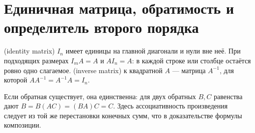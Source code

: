 \section{Единичная матрица, обратимость и определитель второго порядка}
\begin{definition}
 (identity matrix) \(I_n\) имеет единицы на главной диагонали и нули вне неё. При подходящих размерах \(I_mA=A\) и \(AI_n=A\): в каждой строке или столбце остаётся ровно одно слагаемое.  (inverse matrix) к квадратной \(A\) — матрица \(A^{-1}\), для которой \(AA^{-1}=A^{-1}A=I_n\).
\end{definition}
Если обратная существует, она единственна: для двух обратных \(B,C\) равенства дают \(B=B(AC)=(BA)C=C\). Здесь ассоциативность произведения следует из той же перестановки конечных сумм, что в доказательстве формулы композиции.

